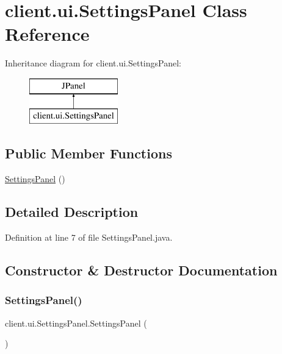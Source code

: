 \hypertarget{classclient_1_1ui_1_1_settings_panel}{}\section{client.\+ui.\+Settings\+Panel Class Reference}
\label{classclient_1_1ui_1_1_settings_panel}
Inheritance diagram for client.\+ui.\+Settings\+Panel\+:\begin{figure}[H]
\begin{center}
\leavevmode
\includegraphics[height=2.000000cm]{classclient_1_1ui_1_1_settings_panel}
\end{center}
\end{figure}
\subsection*{Public Member Functions}
\begin{DoxyCompactItemize}
\item 
\hyperlink{classclient_1_1ui_1_1_settings_panel_a95dfa76100b4d18863cd0b572c631ebf}{Settings\+Panel} ()
\end{DoxyCompactItemize}


\subsection{Detailed Description}


Definition at line 7 of file Settings\+Panel.\+java.



\subsection{Constructor \& Destructor Documentation}
\hypertarget{classclient_1_1ui_1_1_settings_panel_a95dfa76100b4d18863cd0b572c631ebf}{}\label{classclient_1_1ui_1_1_settings_panel_a95dfa76100b4d18863cd0b572c631ebf} 
\subsubsection{\texorpdfstring{Settings\+Panel()}{SettingsPanel()}}
{\footnotesize\ttfamily client.\+ui.\+Settings\+Panel.\+Settings\+Panel (\begin{DoxyParamCaption}{ }\end{DoxyParamCaption})}

